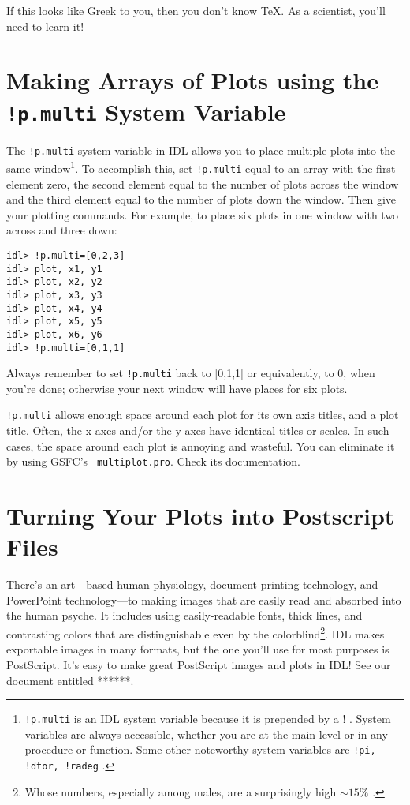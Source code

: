 \documentclass[preprint]{aastex}
\begin{document}
\noindent If this looks like Greek to you, then you don't know
\TeX. As a scientist, you'll need to learn it!
 
\section{Making Arrays of Plots using the {\tt !p.multi} System Variable}\label{pmulti}

	The {\tt !p.multi} system variable in IDL allows you to place
multiple plots into the same window\footnote{{\tt !p.multi} is an IDL system
variable because it is prepended by a ! . System variables are always
accessible, whether you are at the main level or in any procedure or
function. Some other noteworthy system variables are {\tt !pi, !dtor, 
!radeg} .}.  To accomplish this, set {\tt !p.multi} equal to an array with the
first element zero, the second element equal to the number of plots across
the window and the third element equal to the number of plots down the
window.  Then give your plotting commands.  For example, to 
place six plots in one window with two across and three down:

\begin{verbatim}
idl> !p.multi=[0,2,3]
idl> plot, x1, y1
idl> plot, x2, y2
idl> plot, x3, y3
idl> plot, x4, y4
idl> plot, x5, y5
idl> plot, x6, y6
idl> !p.multi=[0,1,1]
\end{verbatim}

\noindent Always remember to set {\tt !p.multi} back to [0,1,1] or
equivalently, to 0, when you're done;
otherwise your next window will have places for six plots.

{\tt !p.multi} allows enough space around each plot for its own axis titles,
and a plot title. Often, the x-axes and/or the y-axes have identical
titles or scales. In such cases, the space around each plot is annoying
and wasteful. You can eliminate it by using GSFC's {\tt
multiplot.pro}. Check its documentation.

\section{Turning Your Plots into Postscript Files}\label{psfiles}

There's an art---based human physiology, document printing technology,
and PowerPoint technology---to making images that are easily read and
absorbed into the human psyche. It includes using easily-readable
fonts, thick lines, and contrasting colors that are distinguishable even
by the colorblind\footnote{Whose numbers, especially among males, are a
surprisingly high $\sim 15\%$ .}. IDL makes exportable images in many
formats, but the one you'll use for most purposes is PostScript. It's
easy to make great PostScript images and plots in IDL! See our document
entitled ******.
\end{document}
